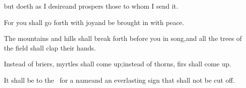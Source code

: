 \begin{inparaenum}
  \pa{}but doeth as I desire\pa{}and prospers those to whom I send it.%

  \pa{} For you shall go forth with joy\pa{}and be brought in with peace.%

  \pa{}The mountains and hills shall break forth before you in song,\pa{}and all the trees of the field shall clap their hands.%

  \pa{} Instead of briers, myrtles shall come up;\pa{}instead of thorns, firs shall come up.%

  \pa{}It shall be to the \lord\ for a name\pa{}and an everlasting sign that shall not be cut off.%
\end{inparaenum}
